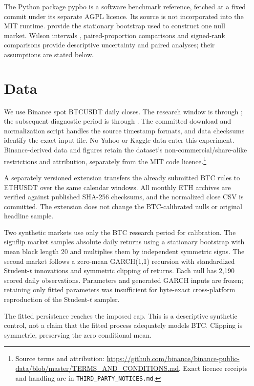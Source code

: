 \documentclass[11pt]{article}
\begin{document}
The Python package \href{https://github.com/esvhd/pypbo/tree/4d723f06498267a2a6280cb9d7d5649348e961d1}{pypbo}
is a software benchmark reference, fetched at a fixed commit under its separate
AGPL licence. Its source is not incorporated into the MIT runtime.
\citet{bootstrap} provide the stationary bootstrap used to construct one null
market. Wilson intervals \citep{wilson}, paired-proportion comparisons
\citep{mcnemar} and signed-rank comparisons \citep{wilcoxon} provide descriptive
uncertainty and paired analyses; their assumptions are stated below.

\section{Data}
We use Binance spot BTCUSDT daily closes. The research window is
\ResearchStart{} through \ResearchEnd{}; the subsequent diagnostic period is
\TestStart{} through \TestEnd{}. The committed download and normalization
script handles the source timestamp formats, and data checksums identify the
exact input file. No Yahoo or Kaggle data enter this experiment.
Binance-derived data and figures retain the dataset's non-commercial/share-alike
restrictions and attribution, separately from the MIT code licence.\footnote{Source terms and attribution:
\url{https://github.com/binance/binance-public-data/blob/master/TERMS_AND_CONDITIONS.md}.
Exact licence receipts and handling are in \texttt{THIRD\_PARTY\_NOTICES.md}.}

A separately versioned extension transfers the already submitted BTC rules to
ETHUSDT over the same calendar windows. All monthly ETH archives are verified
against published SHA-256 checksums, and the normalized close CSV is committed.
The extension does not change the BTC-calibrated nulls or original headline sample.

Two synthetic markets use only the BTC research period for calibration. The
signflip market samples absolute daily returns using a stationary bootstrap
with mean block length 20 and multiplies them by independent symmetric signs.
The second market follows a zero-mean GARCH(1,1) recursion \citep{garch} with standardized
Student-$t$ innovations and symmetric clipping of returns. Each null has
2,190 scored daily observations. Parameters and generated GARCH inputs are
frozen; retaining only fitted parameters was insufficient for byte-exact
cross-platform reproduction of the Student-$t$ sampler.

The fitted persistence reaches the imposed cap. This is a descriptive \mbox{synthetic}
control, not a claim that the fitted process adequately models BTC. Clipping is
symmetric, preserving the zero conditional mean.
\end{document}
